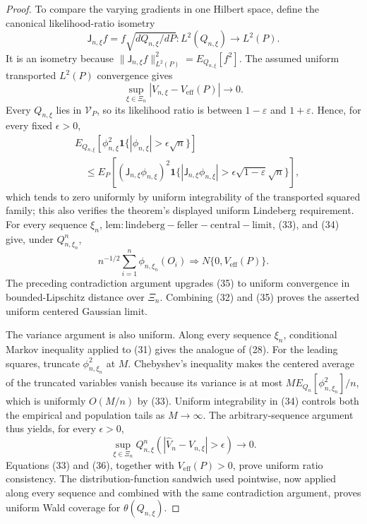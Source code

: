 \documentclass{article}
\begin{document}
\begin{proof}
To compare the varying gradients in one Hilbert space, define the canonical likelihood-ratio isometry
\[
 \mathsf J_{n,\xi}f=f\sqrt{dQ_{n,\xi}/dP}:L^2(Q_{n,\xi})\longrightarrow L^2(P).
\]
It is an isometry because
\(\|\mathsf J_{n,\xi}f\|_{L^2(P)}^2=E_{Q_{n,\xi}}[f^2]\).  The assumed uniform transported \(L^2(P)\) convergence gives
\[
 \sup_{\xi\in\Xi_n}|V_{n,\xi}-V_{\mathrm{eff}}(P)|\longrightarrow0.       \tag{33}
\]
Every \(Q_{n,\xi}\) lies in \(\mathcal V_P\), so its likelihood ratio is between \(1-\varepsilon\) and \(1+\varepsilon\).  Hence, for every fixed \(\epsilon>0\),
\[
\begin{aligned}
 &E_{Q_{n,\xi}}[\phi_{n,\xi}^2
       \mathbf 1\{|\phi_{n,\xi}|>\epsilon\sqrt n\}]\\
 &\quad\le E_P[(\mathsf J_{n,\xi}\phi_{n,\xi})^2
       \mathbf 1\{|\mathsf J_{n,\xi}\phi_{n,\xi}|
       >\epsilon\sqrt{1-\varepsilon}\sqrt n\}],
                                                                                \tag{34}
\end{aligned}
\]
which tends to zero uniformly by uniform integrability of the transported squared family; this also verifies the theorem's displayed uniform Lindeberg requirement.  For every sequence \(\xi_n\), \(\mathrm{lem:lindeberg-feller-central-limit}\), (33), and (34) give, under \(Q_{n,\xi_n}^n\),
\[
 n^{-1/2}\sum_{i=1}^n\phi_{n,\xi_n}(O_i)
 \Rightarrow N\{0,V_{\mathrm{eff}}(P)\}.                                  \tag{35}
\]
The preceding contradiction argument upgrades (35) to uniform convergence in bounded-Lipschitz distance over \(\Xi_n\).  Combining (32) and (35) proves the asserted uniform centered Gaussian limit.

The variance argument is also uniform.  Along every sequence \(\xi_n\), conditional Markov inequality applied to (31) gives the analogue of (28).  For the leading squares, truncate \(\phi_{n,\xi_n}^2\) at \(M\).  Chebyshev's inequality makes the centered average of the truncated variables vanish because its variance is at most
\(M E_{Q_n}[\phi_{n,\xi_n}^2]/n\), which is uniformly \(O(M/n)\) by (33).  Uniform integrability in (34) controls both the empirical and population tails as \(M\to\infty\).  The arbitrary-sequence argument thus yields, for every \(\epsilon>0\),
\[
 \sup_{\xi\in\Xi_n}Q_{n,\xi}^n
 \left(\left|\widehat V_n-V_{n,\xi}\right|>\epsilon\right)
 \longrightarrow0.                                                         \tag{36}
\]
Equations (33) and (36), together with \(V_{\mathrm{eff}}(P)>0\), prove uniform ratio consistency.  The distribution-function sandwich used pointwise, now applied along every sequence and combined with the same contradiction argument, proves uniform Wald coverage for \(\theta(Q_{n,\xi})\).


\end{proof}
\end{document}
